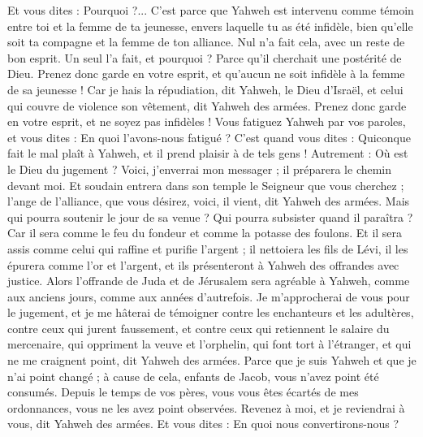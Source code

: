 \begin{multicols}{2}
Et vous dites : Pourquoi ?... C'est parce que Yahweh est intervenu comme témoin entre toi et la femme de ta jeunesse, envers laquelle tu as été infidèle, bien qu’elle soit ta compagne et la femme de ton alliance.
Nul n’a fait cela, avec un reste de bon esprit. Un seul l’a fait, et pourquoi ? Parce qu'il cherchait une postérité de Dieu. Prenez donc garde en votre esprit, et qu’aucun ne soit infidèle à la femme de sa jeunesse !
Car je hais la répudiation, dit Yahweh, le Dieu d'Israël, et celui qui couvre de violence son vêtement, dit Yahweh des armées. Prenez donc garde en votre esprit, et ne soyez pas infidèles !
Vous fatiguez Yahweh par vos paroles, et vous dites : En quoi l'avons-nous fatigué ? C'est quand vous dites : Quiconque fait le mal plaît à Yahweh, et il prend plaisir à de tels gens ! Autrement : Où est le Dieu du jugement ?
\VerseOne{}Voici, j'enverrai mon messager ; il préparera le chemin devant moi. Et soudain entrera dans son temple le Seigneur que vous cherchez ; l’ange de l'alliance, que vous désirez, voici, il vient, dit Yahweh des armées.
Mais qui pourra soutenir le jour de sa venue ? Qui pourra subsister quand il paraîtra ? Car il sera comme le feu du fondeur et comme la potasse des foulons.
Et il sera assis comme celui qui raffine et purifie l'argent ; il nettoiera les fils de Lévi, il les épurera comme l’or et l'argent, et ils présenteront à Yahweh des offrandes avec justice.
Alors l’offrande de Juda et de Jérusalem sera agréable à Yahweh, comme aux anciens jours, comme aux années d'autrefois.
Je m'approcherai de vous pour le jugement, et je me hâterai de témoigner contre les enchanteurs et les adultères, contre ceux qui jurent faussement, et contre ceux qui retiennent le salaire du mercenaire, qui oppriment la veuve et l'orphelin, qui font tort à l'étranger, et qui ne me craignent point, dit Yahweh des armées.
Parce que je suis Yahweh et que je n'ai point changé ; à cause de cela, enfants de Jacob, vous n'avez point été consumés.
Depuis le temps de vos pères, vous vous êtes écartés de mes ordonnances, vous ne les avez point observées. Revenez à moi, et je reviendrai à vous, dit Yahweh des armées. Et vous dites : En quoi nous convertirons-nous ?

\end{multicols}
